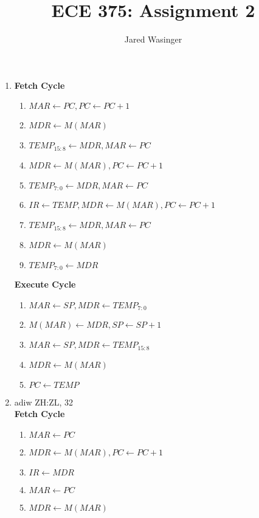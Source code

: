\documentclass{article}
\begin{document}
  \title{ECE 375: Assignment 2}
  \author{Jared Wasinger}

  \maketitle

  \begin{enumerate}
    \item \textbf{Fetch Cycle} \begin{enumerate}
      \item $MAR \leftarrow PC, PC \leftarrow PC + 1$
      \item $MDR \leftarrow M(MAR)$
      \item $TEMP_{15:8} \leftarrow MDR, MAR \leftarrow PC$
      \item $MDR \leftarrow M(MAR), PC \leftarrow PC + 1$
      \item $TEMP_{7:0} \leftarrow MDR, MAR \leftarrow PC$
      \item $IR \leftarrow TEMP, MDR \leftarrow M(MAR), PC \leftarrow PC + 1$
      \item $TEMP_{15:8} \leftarrow MDR, MAR \leftarrow PC$
      \item $MDR \leftarrow M(MAR)$
      \item $TEMP_{7:0} \leftarrow MDR$
      \end{enumerate}
    \textbf{Execute Cycle} \begin{enumerate}
      \item $MAR \leftarrow SP, MDR \leftarrow TEMP_{7:0}$
      \item $M(MAR) \leftarrow MDR, SP \leftarrow SP + 1$
      \item $MAR \leftarrow SP, MDR \leftarrow TEMP_{15:8}$
      \item $MDR \leftarrow M(MAR)$
      \item $PC \leftarrow TEMP$
      \end{enumerate}
    \item adiw ZH:ZL, 32\\
      \textbf{Fetch Cycle}\begin{enumerate}
        \item $MAR \leftarrow PC$
        \item $MDR \leftarrow M(MAR), PC \leftarrow PC + 1$ 
        \item $IR \leftarrow MDR$
        \item $MAR \leftarrow PC$
        \item $MDR \leftarrow M(MAR)$
        \end{enumerate}

\end{enumerate}
\end{document}
